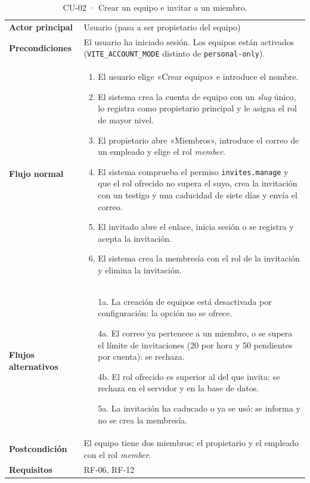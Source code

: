 {\footnotesize
\begin{xltabular}{\textwidth}{@{}>{\bfseries}p{2.6cm}X@{}}
  \caption{CU-02 · Crear un equipo e invitar a un miembro.}\label{tab:ana-cu02}\\
    \toprule
    Actor principal & Usuario (pasa a ser propietario del equipo) \\
    Precondiciones & El usuario ha iniciado sesión. Los equipos están activados (\texttt{VITE\_ACCOUNT\_MODE} distinto de \texttt{personal-only}). \\
    \midrule
    Flujo normal &
      \begin{enumerate}[nosep,leftmargin=*]
        \item El usuario elige «Crear equipo» e introduce el nombre.
        \item El sistema crea la cuenta de equipo con un \textit{slug} único, lo registra como propietario principal y le asigna el rol de mayor nivel.
        \item El propietario abre «Miembros», introduce el correo de un empleado y elige el rol \textit{member}.
        \item El sistema comprueba el permiso \texttt{invites.manage} y que el rol ofrecido no supera el suyo, crea la invitación con un testigo y una caducidad de siete días y envía el correo.
        \item El invitado abre el enlace, inicia sesión o se registra y acepta la invitación.
        \item El sistema crea la membresía con el rol de la invitación y elimina la invitación.
      \end{enumerate} \\
    \midrule
    Flujos alternativos &
      \begin{itemize}[nosep,leftmargin=*]
        \item[1a.] La creación de equipos está desactivada por configuración: la opción no se ofrece.
        \item[4a.] El correo ya pertenece a un miembro, o se supera el límite de invitaciones (20 por hora y 50 pendientes por cuenta): se rechaza.
        \item[4b.] El rol ofrecido es superior al del que invita: se rechaza en el servidor y en la base de datos.
        \item[5a.] La invitación ha caducado o ya se usó: se informa y no se crea la membresía.
      \end{itemize} \\
    \midrule
    Postcondición & El equipo tiene dos miembros: el propietario y el empleado con el rol \textit{member}. \\
    Requisitos & RF-06, RF-12 \\
    \bottomrule
\end{xltabular}}

